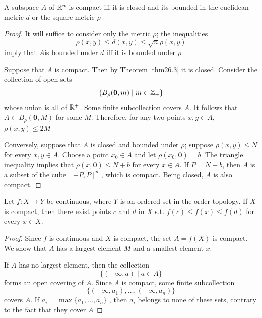 \documentclass[11pt]{article}
\begin{document}
\begin{theorem}[]
A subspace \(A\) of \(\mathbb{R}^n\) is compact iff it is closed and its bounded in the euclidean
metric \(d\) or the square metric \(\rho\)
\end{theorem}

\begin{proof}
It will suffice to consider only the metric \(\rho\); the inequalities
\begin{equation*}
\rho(x,y)\le d(x,y)\le\sqrt{n}\rho(x,y)
\end{equation*}
imply that \(A\)is bounded under \(d\) iff it is bounded under \(\rho\)

Suppose that \(A\) is compact. Then by Theorem \ref{thm26.3} it is closed. Consider the collection
of open sets
\begin{equation*}
\{B_\rho(\textbf{0},m)\mid m\in\mathbb{Z}_+\}
\end{equation*}
whose union is all of \(\mathbb{R}^+\). Some finite subcollection covers \(A\). It follows
that \(A\subset B_\rho(\textbf{0},M)\) for some \(M\). Therefore, for any two
points \(x,y\in A\), \(\rho(x,y)\le 2M\)

Conversely, suppose that \(A\) is closed and bounded under \(\rho\); suppose \(\rho(x,y)\le N\) for
every \(x,y\in A\). Choose a point \(x_0\in A\) and let \(\rho(x_0,\textbf{0})=b\). The triangle
inequality implies that \(\rho(x,\textbf{0})\le N+b\) for every \(x\in A\). If \(P=N+b\), then \(A\) is
a subset of the cube \([-P,P]^n\) , which is compact. Being closed, \(A\) is also compact.
\end{proof}

\begin{theorem}
Let \(f:X\to Y\) be continuous, where \(Y\) is an ordered set in the order topology. If \(X\) is
compact, then there exist points \(c\) and \(d\) in \(X\) s.t. \(f(c)\le f(x)\le f(d)\) for
every \(x\in X\).
\end{theorem}

\begin{proof}
Since \(f\) is continuous and \(X\) is compact, the set \(A=f(X)\) is compact. We show that \(A\)
has a largest element \(M\) and a smallest element \(x\).

If \(A\) has no largest element, then the collection
\begin{equation*}
\{(-\infty,a)\mid a\in A\}
\end{equation*}
forms an open covering of \(A\). Since \(A\) is compact, some finite subcollection
\begin{equation*}
\{(-\infty,a_1),\dots,(-\infty,a_n)\}
\end{equation*}
covers \(A\). If \(a_i=\max\{a_1,\dots,a_n\}\) , then \(a_i\) belongs to none of these sets, contrary to
the fact that they cover \(A\)
\end{proof}
\end{document}
